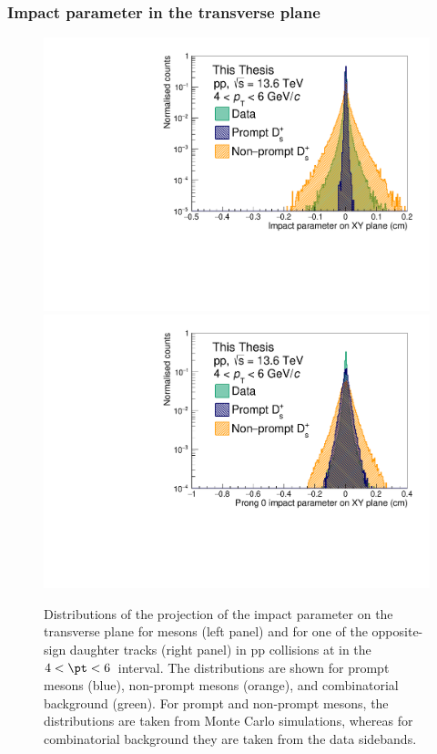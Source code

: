 \subsubsection{Impact parameter in the transverse plane}
\begin{figure}[tb]
    \centering
    \includegraphics[width=0.48\linewidth]{Figures/Chapter 4/ImpactParameterXY.pdf}
    \includegraphics[width=0.48\linewidth]{Figures/Chapter 4/ImpactParameter0.pdf}
    \caption{Distributions of the projection of the impact parameter on the transverse plane for \ds mesons (left panel) and for one of the opposite-sign daughter tracks (right panel) in pp collisions at \thirteen in the $4 < \pt < 6$~\gevc interval. The distributions are shown for prompt \ds mesons (blue), non-prompt \ds mesons (orange), and combinatorial background (green). For prompt and non-prompt \ds mesons, the distributions are taken from Monte Carlo simulations, whereas for combinatorial background they are taken from the data sidebands. }
    \label{fig:ImpactParameter}
\end{figure}
